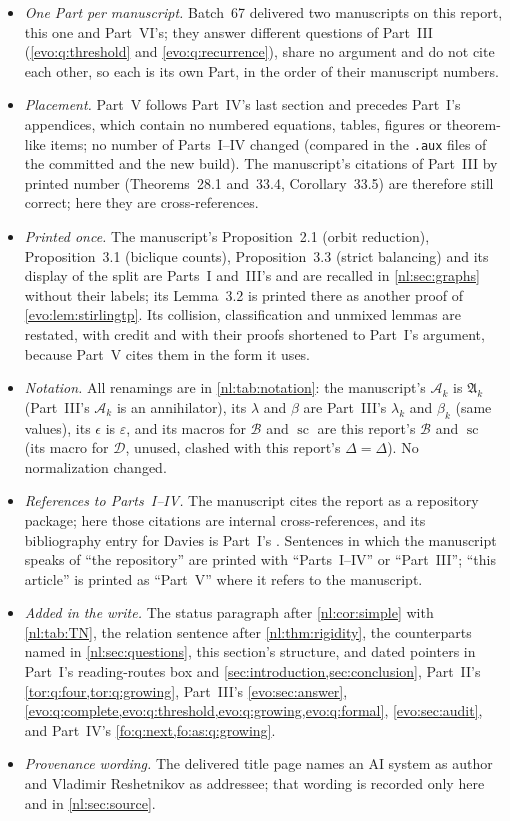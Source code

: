 \documentclass[11pt,a4paper]{article}
\numberwithin{equation}{section}
\theoremstyle{definition}
\theoremstyle{remark}
\newcommand{\D}{\Delta}
\newcommand{\statecomplex}{\operatorname{sc}}
\newcommand{\Bip}{\mathcal B}
\newcommand{\nlenv}{\mathfrak A}
\begin{document}
\begin{itemize}
\item \emph{One Part per manuscript.} Batch~67 delivered two manuscripts on
 this report, this one and Part~VI's; they answer different questions of
 Part~III (\cref{evo:q:threshold} and \cref{evo:q:recurrence}), share no
 argument and do not cite each other, so each is its own Part, in the order
 of their manuscript numbers.
\item \emph{Placement.} Part~V follows Part~IV's last section and precedes
 Part~I's appendices, which contain no numbered equations, tables, figures
 or theorem-like items; no number of Parts~I--IV changed (compared in the
 \texttt{.aux} files of the committed and the new build). The manuscript's
 citations of Part~III by printed number (Theorems~28.1 and~33.4,
 Corollary~33.5) are therefore still correct; here they are
 cross-references.
\item \emph{Printed once.} The manuscript's Proposition~2.1 (orbit
 reduction), Proposition~3.1 (biclique counts), Proposition~3.3 (strict
 balancing) and its display of the split are Parts~I and~III's and are
 recalled in \cref{nl:sec:graphs} without their labels; its Lemma~3.2 is
 printed there as another proof of \cref{evo:lem:stirlingtp}. Its
 collision, classification and unmixed lemmas are restated, with credit
 and with their proofs shortened to Part~I's argument, because Part~V
 cites them in the form it uses.
\item \emph{Notation.} All renamings are in \cref{nl:tab:notation}: the
 manuscript's $\mathcal A_k$ is $\nlenv_k$ (Part~III's $\mathcal A_k$ is an
 annihilator), its $\lambda$ and $\beta$ are Part~III's $\lambda_k$ and
 $\beta_k$ (same values), its $\epsilon$ is $\varepsilon$, and its macros
 for $\mathcal B$ and $\operatorname{sc}$ are this report's $\Bip$ and
 $\statecomplex$ (its macro for $\mathcal D$, unused, clashed with this
 report's $\D=\Delta$). No normalization changed.
\item \emph{References to Parts~I--IV.} The manuscript cites the report as
 a repository package; here those citations are internal cross-references,
 and its bibliography entry for Davies is Part~I's \cite{Davies2017}.
 Sentences in which the manuscript speaks of ``the repository'' are
 printed with ``Parts~I--IV'' or ``Part~III''; ``this article'' is printed
 as ``Part~V'' where it refers to the manuscript.
\item \emph{Added in the write.} The status paragraph after
 \cref{nl:cor:simple} with \cref{nl:tab:TN}, the relation sentence after
 \cref{nl:thm:rigidity}, the counterparts named in
 \cref{nl:sec:questions}, this section's structure, and dated pointers in
 Part~I's reading-routes box and \cref{sec:introduction,sec:conclusion},
 Part~II's \cref{tor:q:four,tor:q:growing}, Part~III's
 \cref{evo:sec:answer}, \cref{evo:q:complete,evo:q:threshold,evo:q:growing,evo:q:formal},
 \cref{evo:sec:audit}, and Part~IV's \cref{fo:q:next,fo:as:q:growing}.
\item \emph{Provenance wording.} The delivered title page names an AI
 system as author and Vladimir Reshetnikov as addressee; that wording is
 recorded only here and in \cref{nl:sec:source}.
\end{itemize}
\endgroup
\end{document}
